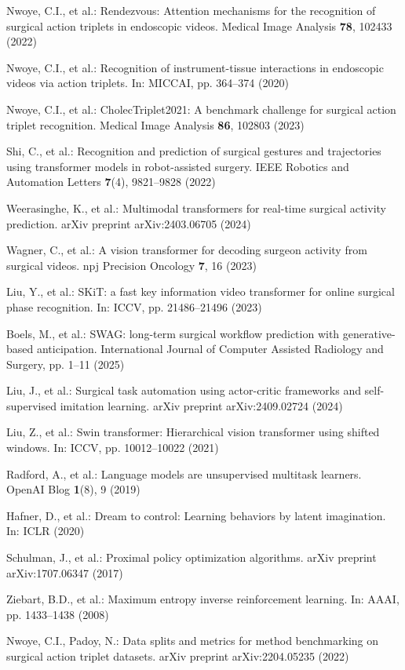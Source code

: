 \documentclass[runningheads]{llncs}
\begin{document}
\begin{thebibliography}{20}
Nwoye, C.I., et al.: Rendezvous: Attention mechanisms for the recognition of surgical action triplets in endoscopic videos. Medical Image Analysis \textbf{78}, 102433 (2022)

Nwoye, C.I., et al.: Recognition of instrument-tissue interactions in endoscopic videos via action triplets. In: MICCAI, pp. 364--374 (2020)

Nwoye, C.I., et al.: CholecTriplet2021: A benchmark challenge for surgical action triplet recognition. Medical Image Analysis \textbf{86}, 102803 (2023)

Shi, C., et al.: Recognition and prediction of surgical gestures and trajectories using transformer models in robot-assisted surgery. IEEE Robotics and Automation Letters \textbf{7}(4), 9821--9828 (2022)

Weerasinghe, K., et al.: Multimodal transformers for real-time surgical activity prediction. arXiv preprint arXiv:2403.06705 (2024)

Wagner, C., et al.: A vision transformer for decoding surgeon activity from surgical videos. npj Precision Oncology \textbf{7}, 16 (2023)

Liu, Y., et al.: SKiT: a fast key information video transformer for online surgical phase recognition. In: ICCV, pp. 21486--21496 (2023)

Boels, M., et al.: SWAG: long-term surgical workflow prediction with generative-based anticipation. International Journal of Computer Assisted Radiology and Surgery, pp. 1--11 (2025)

Liu, J., et al.: Surgical task automation using actor-critic frameworks and self-supervised imitation learning. arXiv preprint arXiv:2409.02724 (2024)

Liu, Z., et al.: Swin transformer: Hierarchical vision transformer using shifted windows. In: ICCV, pp. 10012--10022 (2021)

Radford, A., et al.: Language models are unsupervised multitask learners. OpenAI Blog \textbf{1}(8), 9 (2019)

Hafner, D., et al.: Dream to control: Learning behaviors by latent imagination. In: ICLR (2020)

Schulman, J., et al.: Proximal policy optimization algorithms. arXiv preprint arXiv:1707.06347 (2017)

Ziebart, B.D., et al.: Maximum entropy inverse reinforcement learning. In: AAAI, pp. 1433--1438 (2008)

Nwoye, C.I., Padoy, N.: Data splits and metrics for method benchmarking on surgical action triplet datasets. arXiv preprint arXiv:2204.05235 (2022)
\end{thebibliography}
\end{document}
